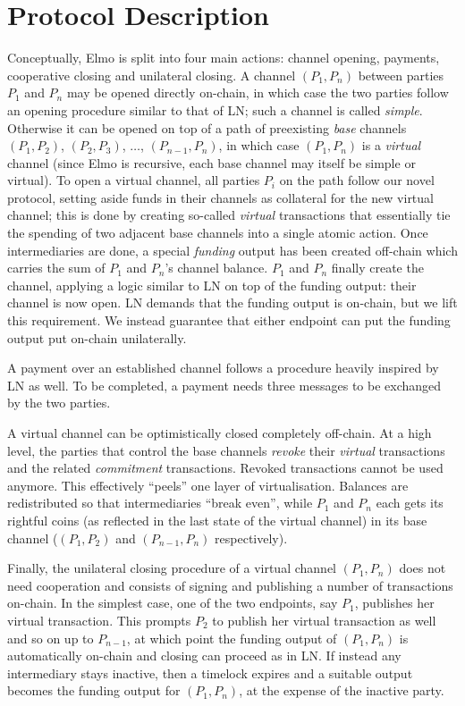 \section{Protocol Description}
  Conceptually, Elmo is split into four main actions: channel opening,
  payments, cooperative closing and unilateral closing. A channel $(P_1, P_n)$
  between parties $P_1$ and $P_n$
  may be opened directly on-chain, in which case the two parties follow an
  opening procedure similar to that of LN; such a channel is called
  \emph{simple}.
  Otherwise it can be opened on top of a path
  of preexisting \emph{base} channels $(P_1, P_2)$, $(P_2, P_3)$, $\dots$,
  $(P_{n-1}, P_{n})$, in which case $(P_1, P_n)$ is a \emph{virtual}
  channel (since Elmo is recursive, each base channel may itself be simple or
  virtual). To open a virtual
  channel, all parties $P_i$ on the
  path follow our novel protocol, setting aside funds in their channels as
  collateral for the new virtual channel; this is done
  by creating so-called \emph{virtual} transactions that essentially
  tie the spending of two adjacent base channels into a single atomic action.
  Once intermediaries are done, a special \emph{funding} output has been
  created off-chain which carries the sum of $P_1$ and $P_n$'s channel
  balance. $P_1$ and $P_n$
  finally create the channel, applying a logic similar to LN on top of
  the funding output: their channel is now open. LN demands that the funding
  output is on-chain, but we lift this requirement. We instead guarantee that
  either endpoint can put the funding output put on-chain unilaterally.

  A payment over an established channel follows a procedure heavily inspired by
  LN as well. To be completed, a payment needs three messages to be exchanged by
  the two parties.

  A virtual channel can be optimistically closed completely off-chain. At a high
  level, the parties that control the base channels \emph{revoke} their \emph{virtual}
  transactions and the related \emph{commitment} transactions. Revoked transactions
  cannot be used anymore. This effectively ``peels'' one layer of virtualisation.
  Balances are redistributed so that intermediaries ``break even'', while $P_1$
  and $P_n$ each gets its rightful coins (as reflected in the last state of the
  virtual channel) in its base channel ($(P_1, P_2)$ and $(P_{n-1}, P_n)$
  respectively).

  Finally, the unilateral closing procedure of a virtual channel $(P_1, P_n)$
  does not need cooperation and consists of signing and publishing a number of
  transactions on-chain. In the simplest case, one of the two endpoints, say
  $P_1$, publishes her virtual transaction. This prompts $P_2$ to publish her
  virtual transaction as well and so on up to $P_{n-1}$, at which point the
  funding output of $(P_1, P_n)$ is automatically on-chain and closing can
  proceed as in LN. If instead any intermediary stays inactive, then a timelock
  expires and a suitable output becomes the funding output for $(P_1, P_n)$, at
  the expense of the inactive party.

